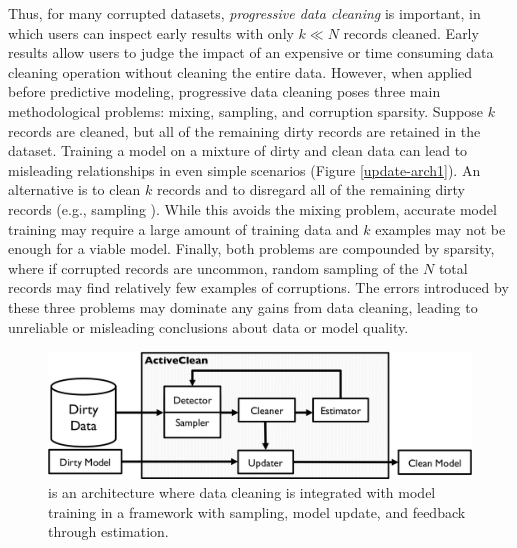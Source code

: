 Thus, for many corrupted datasets, \emph{progressive data cleaning} is important, in which users can inspect early results with only $k \ll N$ records cleaned.
Early results allow users to judge the impact of an expensive or time consuming data cleaning operation without cleaning the entire data.
However, when applied before predictive modeling, progressive data cleaning poses three main methodological problems: mixing, sampling, and corruption sparsity.
Suppose $k$ records are cleaned, but all of the remaining dirty records are retained in the dataset.
Training a model on a mixture of dirty and clean data can lead to misleading relationships in even simple scenarios (Figure \ref{update-arch1}).
An alternative is to clean $k$ records and to disregard all of the remaining dirty records (e.g., sampling \cite{wang1999sample}).
While this avoids the mixing problem, accurate model training may require a large amount of training data and $k$ examples may not be enough for a viable model.
Finally, both problems are compounded by sparsity, where if corrupted records are uncommon, random sampling of the $N$ total records may find relatively few examples of corruptions.
The errors introduced by these three problems may dominate any gains from data cleaning, leading to unreliable or misleading conclusions about data or model quality.

\begin{figure}[t]
\centering
 \includegraphics[width=\columnwidth]{figs/arch.png}
 \caption{\sysfull is an architecture where data cleaning is integrated with model training in a framework with sampling, model update, and feedback through estimation. \label{sys-arch}}\vspace{-2em}
\end{figure}

